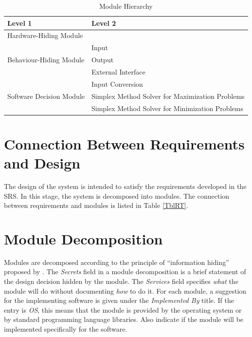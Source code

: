 \documentclass[12pt, titlepage]{article}
\begin{document}
\begin{table}[h!]
\centering
\begin{tabular}{p{} p{}}
\toprule
\textbf{Level 1} & \textbf{Level 2}\\
\midrule

{Hardware-Hiding Module} & ~ \\
\midrule

\multirow{3}{0.3\textwidth}{Behaviour-Hiding Module}
& Input\\ 
& Output\\
& External Interface\\
\midrule

\multirow{3}{0.3\textwidth}{Software Decision Module}
& Input Conversion\\
& Simplex Method Solver for Maximization Problems\\
& Simplex Method Solver for Minimization Problems\\
\bottomrule

\end{tabular}
\caption{Module Hierarchy}
\label{TblMH}
\end{table}

\section{Connection Between Requirements and Design} \label{SecConnection}

The design of the system is intended to satisfy the requirements developed in
the SRS. In this stage, the system is decomposed into modules. The connection
between requirements and modules is listed in Table \ref{TblRT}.

\section{Module Decomposition} \label{SecMD}

Modules are decomposed according to the principle of ``information hiding''
proposed by \citet{ParnasEtAl1984}. The \emph{Secrets} field in a module
decomposition is a brief statement of the design decision hidden by the
module. The \emph{Services} field specifies \emph{what} the module will do
without documenting \emph{how} to do it. For each module, a suggestion for the
implementing software is given under the \emph{Implemented By} title. If the
entry is \emph{OS}, this means that the module is provided by the operating
system or by standard programming language libraries.  Also indicate if the
module will be implemented specifically for the software.
\end{document}
